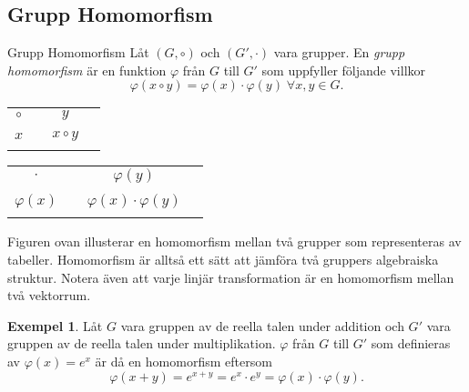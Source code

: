 \documentclass{article}
\theoremstyle{definition}
\newtheorem{exmp}[thm]{Exempel}
\begin{document}
\subsection{Grupp Homomorfism}
\begin{mydef}{Grupp Homomorfism}{}
  Låt $(G, \circ)$ och $(G', \cdot)$ vara grupper. 
  En \textit{grupp homomorfism} är en funktion $\varphi$ från $G$ till $G'$ som 
  uppfyller följande villkor
  \[\varphi (x \circ y) = \varphi (x) \cdot \varphi (y) \; \forall x, y \in G.\]
\end{mydef}

\begin{center}{}
    \begin{tabular}{c | c c c}
      $\circ$ &  & $y$ &\\
      \cline{1-4}
      &  &  & \\
      $x$ &  & $x \circ y$ & \\
      &  &  & \\
    \end{tabular} 
    \quad
    \quad
    \begin{tabular}{c | c c c}
      $\cdot$ &  & $\varphi(y)$ &\\
      \cline{1-4}
      &  &  & \\
      $\varphi(x)$ &  & $\varphi(x) \cdot \varphi(y)$ & \\
      &  &  & \\
    \end{tabular} 
\end{center}
Figuren ovan illusterar en homomorfism mellan två grupper som representeras av tabeller.
Homomorfism är alltså ett sätt att jämföra två gruppers algebraiska struktur. Notera även att 
varje linjär transformation är en homomorfism mellan två vektorrum.

\hypertarget{exmp4.7}{}
\begin{exmp}
  Låt $G$ vara gruppen av de reella talen under addition och $G'$ vara gruppen av de reella 
  talen under multiplikation. $\varphi$ från $G$ till $G'$ som definieras 
  av $\varphi(x) = e^x$ är då en homomorfism eftersom
  \[\varphi(x + y) = e^{x+y} = e^x \cdot e^y = \varphi(x) \cdot \varphi(y).\]
\end{exmp}
\end{document}
